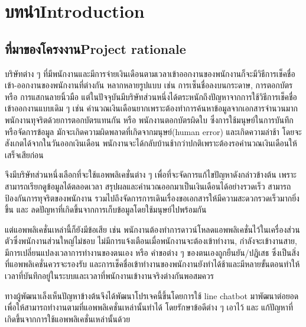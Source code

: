 \chapter{\ifcpe บทนำ\else Introduction\fi}

\section{\ifcpe ที่มาของโครงงาน\else Project rationale\fi}
บริษัทต่าง ๆ ที่มีพนักงานและมีการจ่ายเงินเดือนตามเวลาเข้าออกงานของพนักงานก็จะมีวิธีการเช็คชื่อเข้า-ออกงานของพนักงานที่ต่างกัน 
หลากหลายรูปแบบ เช่น การเซ็นชื่อลงบนกระดาษ, การตอกบัตร หรือ การแสกนลายนิ้วมือ
แต่ในปัจจุบันมีบริษัทส่วนหนึ่งได้ตระหนักถึงปัญหาจากการใช้วิธีการเช็คชื่อเข้าออกงานแบบเดิม ๆ 
เช่น คำนวณเงินเดือนยากเพราะต้องทำการค้นหาข้อมูลจากเอกสารจำนวนมาก 
พนักงานทุจริตด้วยการตอกบัตรแทนกัน 
หรือ พนักงานตอกบัตรผิดใบ 
ซึ่งการใช้มนุษย์ในการบันทึกหรือจัดการข้อมูล มักจะเกิดความผิดพลาดที่เกิดจากมนุษย์(human error) 
และเกิดความล่าช้า โดยจะสังเกตได้จากในวันออกเงินเดือน พนักงานจะได้กลับบ้านช้ากว่าปกติเพราะต้องรอคำนวณเงินเดือนให้เสร็จเสียก่อน

จึงมีบริษัทส่วนหนึ่งเลือกที่จะใช้แอพพลิเคชั่นต่าง ๆ เพื่อที่จะจัดการแก้ไขปัญหาดังกล่าวข้างต้น 
เพราะสามารถเรียกดูข้อมูลได้ตลอดเวลา 
สรุปผลและคำนวณออกมาเป็นเงินเดือนได้อย่างรวดเร็ว 
สามารถป้องกันการทุจริตของพนักงาน 
รวมไปถึงจัดการการเดินเรื่องขอเอกสารให้มีความสะดวกรวดเร็วมากยิ่งขึ้น และ ลดปัญหาที่เกิดขึ้นจากการเก็บข้อมูลโดยใช้มนุษย์ไปพร้อมกัน

แต่แอพพลิเคชั่นเหล่านี้ก็ยังมีข้อเสีย เช่น 
พนักงานต้องทำการดาวน์โหลดแอพพลิเคชั่นไว้ในเครื่องส่วนตัวซึ่งพนักงานส่วนใหญ่ไม่ชอบ
ไม่มีการแจ้งเตือนเมื่อพนักงานจะต้องเข้าทำงาน, กำลังจะเข้างานสาย, มีการเปลี่ยนแปลงเวลาการทำงานของตนเอง หรือ คำขอต่าง ๆ ของตนเองถูกยืนยัน/ปฎิเสธ
ซึ่งเป็นสิ่งที่แอพพลิเคชั่นควรจะรองรับ 
และการเช็คชื่อเข้าทำงานของพนักงานยังทำได้ช้าและมีหลายขั้นตอนทำให้เวลาที่บันทึกอยู่ในระบบและเวลาที่พนักงานเข้างานจริงต่างกันพอสมควร

ทางผู้พัฒนาเล็งเห็นปัญหาข้างต้นจึงได้พัฒนาโปรเจคนี้ขึ้นโดยการใช้ line chatbot มาพัฒนาต่อยอด
เพื่อให้สามารถทำงานตามที่แอพพลิเคชั่นเหล่านั้นทำได้
โดยรักษาข้อดีต่าง ๆ เอาไว้ และ แก้ปัญหาที่เกิดขึ้นจากการใช้แอพพลิเคชั่นเหล่านั้นด้วย

